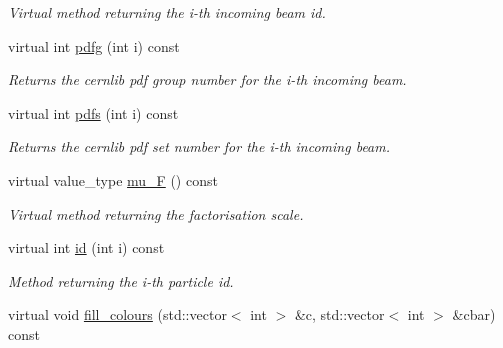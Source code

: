 \begin{DoxyCompactItemize}
\begin{DoxyCompactList}\small\item\em Virtual method returning the i-\/th incoming beam id. \end{DoxyCompactList}\item 
\hypertarget{a00442_a8ddbafb2ee3d95eb1ba96ca48f0f9a9f}{virtual int \hyperlink{a00442_a8ddbafb2ee3d95eb1ba96ca48f0f9a9f}{pdfg} (int i) const }\label{a00442_a8ddbafb2ee3d95eb1ba96ca48f0f9a9f}

\begin{DoxyCompactList}\small\item\em Returns the cernlib pdf group number for the i-\/th incoming beam. \end{DoxyCompactList}\item 
\hypertarget{a00442_a668f0471b0ad13245705972331dcddb7}{virtual int \hyperlink{a00442_a668f0471b0ad13245705972331dcddb7}{pdfs} (int i) const }\label{a00442_a668f0471b0ad13245705972331dcddb7}

\begin{DoxyCompactList}\small\item\em Returns the cernlib pdf set number for the i-\/th incoming beam. \end{DoxyCompactList}\item 
\hypertarget{a00442_a68a37fa41c44fffb61618320b84b2879}{virtual value\-\_\-type \hyperlink{a00442_a68a37fa41c44fffb61618320b84b2879}{mu\-\_\-\-F} () const }\label{a00442_a68a37fa41c44fffb61618320b84b2879}

\begin{DoxyCompactList}\small\item\em Virtual method returning the factorisation scale. \end{DoxyCompactList}\item 
\hypertarget{a00442_a81a3eb4bfad1738c2a49c110d41e5c2a}{virtual int \hyperlink{a00442_a81a3eb4bfad1738c2a49c110d41e5c2a}{id} (int i) const }\label{a00442_a81a3eb4bfad1738c2a49c110d41e5c2a}

\begin{DoxyCompactList}\small\item\em Method returning the i-\/th particle id. \end{DoxyCompactList}\item 
\hypertarget{a00442_ae14bedd0a3ecec9e2c1509faeab471f6}{virtual void \hyperlink{a00442_ae14bedd0a3ecec9e2c1509faeab471f6}{fill\-\_\-colours} (std\-::vector$<$ int $>$ \&c, std\-::vector$<$ int $>$ \&cbar) const }\label{a00442_ae14bedd0a3ecec9e2c1509faeab471f6}


\end{DoxyCompactItemize}
